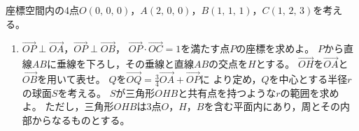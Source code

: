 \documentclass[../../main.tex]{subfiles}
\begin{document}
座標空間内の4点$O(0, \, 0, \, 0)$，$A(2, \, 0, \, 0)$，$B(1, \, 1, \, 1)$，$C(1, \, 2, \, 3)$を考える。
\begin{enumerate}
  \item$\overrightarrow{OP}\perp\overrightarrow{OA}$，$\overrightarrow{OP}\perp\overrightarrow{OB}$，
    $\overrightarrow{OP}\cdot\overrightarrow{OC}=1$を満たす点$P$の座標を求めよ。
  $P$から直線$AB$に垂線を下ろし，その垂線と直線$AB$の交点を$H$とする。
    $\overrightarrow{OH}$を$\overrightarrow{OA}$と$\overrightarrow{OB}$を用いて表せ。
  $Q$を$\displaystyle\overrightarrow{OQ}=\frac{3}{4}\overrightarrow{OA}+\overrightarrow{OP}$に
    より定め，$Q$を中心とする半径$r$の球面$S$を考える。
    $S$が三角形$OHB$と共有点を持つような$r$の範囲を求めよ。
    ただし，三角形$OHB$は3点$O$，$H$，$B$を含む平面内にあり，周とその内部からなるものとする。
\end{enumerate}
\end{document}
